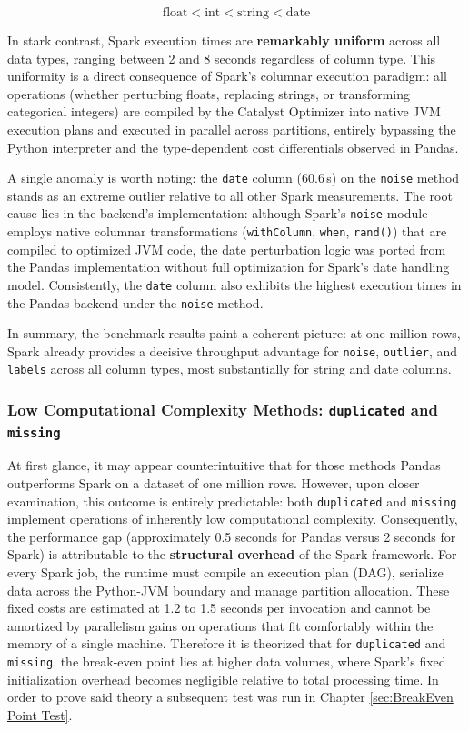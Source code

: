 \documentclass[../main.tex]{subfiles}
\begin{document}
\[
\text{float} < \text{int} < \text{string} < \text{date}
\]

In stark contrast, Spark execution times are \textbf{remarkably uniform} across all data types, ranging between 2 and 8 seconds regardless of column type. This uniformity is a direct consequence of Spark's columnar execution paradigm: all operations (whether perturbing floats, replacing strings, or transforming categorical integers) are compiled by the Catalyst Optimizer into native JVM execution plans and executed in parallel across partitions, entirely bypassing the Python interpreter and the type-dependent cost differentials observed in Pandas.

A single anomaly is worth noting: the \texttt{date} column (60.6\,s) on the \texttt{noise} method stands as an extreme outlier relative to all other Spark measurements. The root cause lies in the backend's implementation: although Spark's \texttt{noise} module employs native columnar transformations (\texttt{withColumn}, \texttt{when}, \texttt{rand()}) that are compiled to optimized JVM code, the date perturbation logic was ported from the Pandas implementation without full optimization for Spark's date handling model. Consistently, the \texttt{date} column also exhibits the highest execution times in the Pandas backend under the \texttt{noise} method.

In summary, the benchmark results paint a coherent picture: at one million rows, Spark already provides a decisive throughput advantage for \texttt{noise}, \texttt{outlier}, and \texttt{labels} across all column types, most substantially for string and date columns.

\subsubsection{Low Computational Complexity Methods: \texttt{duplicated} and \texttt{missing}}
At first glance, it may appear counterintuitive that for those methods Pandas outperforms Spark on a dataset of one million rows. However, upon closer examination, this outcome is entirely predictable: both \texttt{duplicated} and \texttt{missing} implement operations of inherently low computational complexity. Consequently, the performance gap (approximately 0.5 seconds for Pandas versus 2 seconds for Spark) is attributable to the \textbf{structural overhead} of the Spark framework. For every Spark job, the runtime must compile an execution plan (DAG), serialize data across the Python-JVM boundary and manage partition allocation. These fixed costs are estimated at 1.2 to 1.5 seconds per invocation and cannot be amortized by parallelism gains on operations that fit comfortably within the memory of a single machine. Therefore it is theorized that for \texttt{duplicated} and \texttt{missing}, the break-even point lies at higher data volumes, where Spark's fixed initialization overhead becomes negligible relative to total processing time.
In order to prove said theory a subsequent test was run in Chapter \ref{sec:BreakEven Point Test}.
\end{document}
